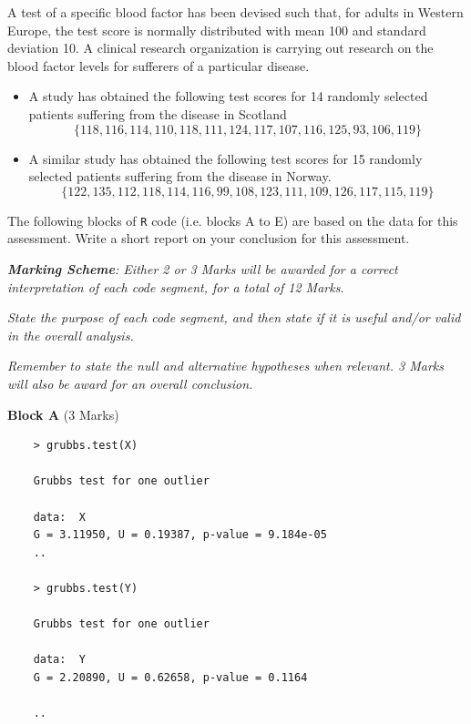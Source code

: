 \documentclass[a4paper,12pt]{article}
\begin{document}
A test of a specific blood factor has been devised such that, for adults in Western Europe, the test score is normally distributed with mean 100 and standard deviation 10. A clinical research organization is carrying out research on the blood factor levels for sufferers of a particular disease.  

\begin{itemize}
	\item A study has obtained the following test scores for 14 randomly selected patients suffering from the disease in Scotland 
	\[ \{118, 116, 114, 110, 118, 111, 124, 117, 107, 116, 125, 93, 
	106, 119\}\]
	
	\item A similar study has obtained the following test scores for 15 randomly selected patients suffering from the disease in Norway.
	\[\{122, 135, 112, 118, 114, 116, 99, 108, 123, 111, 109, 126, 117, 115, 119\}\]
	
\end{itemize}


% 

\noindent The following blocks of \texttt{R} code (i.e. blocks A to E) are based on the data for this assessment. Write a short report on your conclusion for this assessment. \\ \bigskip

\noindent \textit{\textbf{Marking Scheme}: Either 2 or 3 Marks will be awarded for a correct interpretation of each code segment, for a total of 12 Marks. }

\noindent \textit{State the purpose of each code segment, and then state if it is useful and/or valid in the overall analysis. }

\noindent \textit{Remember to state the null and alternative hypotheses when relevant. 3 Marks will also be award for an overall conclusion. }

\begin{framed}
	\noindent \textbf{Block A} (3 Marks) 
	
	
	\begin{verbatim}
	> grubbs.test(X)
	
	Grubbs test for one outlier
	
	data:  X
	G = 3.11950, U = 0.19387, p-value = 9.184e-05
	..
	
	> grubbs.test(Y)
	
	Grubbs test for one outlier
	
	data:  Y
	G = 2.20890, U = 0.62658, p-value = 0.1164
	
	..
	\end{verbatim}
\end{framed}
\end{document}
